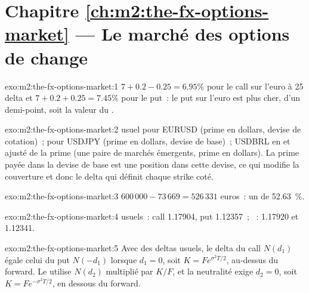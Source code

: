 \section*{Chapitre \ref{ch:m2:the-fx-options-market} --- Le marché des options de change}

\begin{solution}{exo:m2:the-fx-options-market:1}
$7 + 0.2 - 0.25 = 6.95\%$ pour le call sur l'euro à 25 delta et $7 + 0.2 + 0.25 = 7.45\%$ pour
le put~: le put sur l'euro est plus cher, d'un demi-point, soit la valeur du .
\end{solution}

\begin{solution}{exo:m2:the-fx-options-market:2}
 usuel pour EURUSD (prime en dollars, devise de cotation)~;  pour USDJPY
(prime en dollars, devise de base)~; USDBRL en  et ajusté
de la prime (une paire de marchés émergents, prime en dollars). La prime payée
dans la devise de base est une position dans cette devise, ce qui modifie la couverture et donc le
delta qui définit chaque strike coté.
\end{solution}

\begin{solution}{exo:m2:the-fx-options-market:3}
$600\,000 - 73\,669 = 526\,331$ euros~: un  de 52.63~\%.
\end{solution}

\begin{solution}{exo:m2:the-fx-options-market:4}
 usuels~: call 1.17904, put 1.12357~; ~: 1.17920 et
1.12341.
\end{solution}

\begin{solution}{exo:m2:the-fx-options-market:5}
Avec des deltas usuels, le delta du call $N(d_1)$ égale celui du put $N(-d_1)$ lorsque
$d_1 = 0$, soit $K = Fe^{\sigma^2T/2}$, au-dessus du forward. Le 
utilise $N(d_2)$ multiplié par $K/F$, et la neutralité exige $d_2 = 0$, soit
$K = Fe^{-\sigma^2T/2}$, en dessous du forward.
\end{solution}

